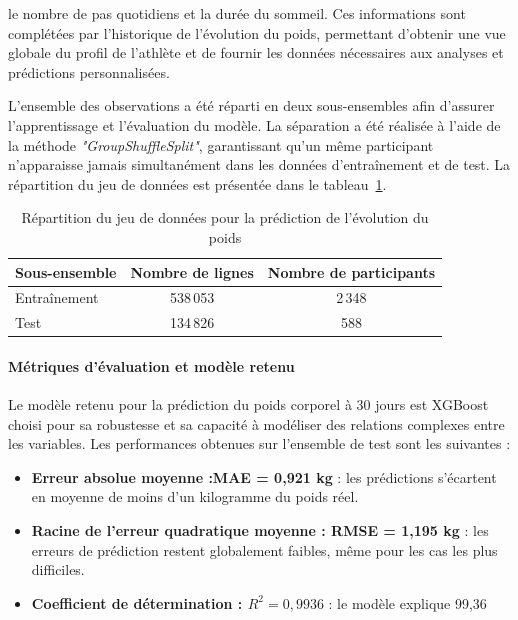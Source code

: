 \documentclass[a4paper,12pt]{report}
\begin{document}
 le nombre de pas quotidiens et la durée du sommeil. Ces informations sont complétées par l’historique de l’évolution du poids, 
 permettant d’obtenir une vue globale du profil de l’athlète et de fournir les données nécessaires aux analyses et prédictions personnalisées.


L'ensemble des observations a été réparti en deux sous-ensembles afin d'assurer
l'apprentissage et l'évaluation du modèle. La séparation a été réalisée à l'aide
de la méthode \textit{"GroupShuffleSplit"}, garantissant qu'un même participant
n'apparaisse jamais simultanément dans les données d'entraînement et de test.
La répartition du jeu de données est présentée dans le tableau~\ref{tab:split_weight}.
\begin{table}[H]
\centering
\caption{Répartition du jeu de données pour la prédiction de l'évolution du poids}
\label{tab:split_weight}
\begin{tabular}{|l|c|c|}
\hline
\textbf{Sous-ensemble} & \textbf{Nombre de lignes} & \textbf{Nombre de participants} \\ \hline
Entraînement & 538\,053 & 2\,348 \\ \hline
Test & 134\,826 & 588 \\ \hline
\end{tabular}
\end{table}
\paragraph{Métriques d’évaluation et modèle retenu}

Le modèle retenu pour la prédiction du poids corporel à 30 jours est XGBoost choisi pour sa robustesse et sa capacité à modéliser des relations complexes entre les variables. Les performances obtenues sur l’ensemble de test sont les suivantes :

\begin{itemize}
\item \textbf{ Erreur absolue moyenne :MAE = 0,921 kg} : les prédictions s’écartent en moyenne de moins d’un kilogramme du poids réel.
\item \textbf{ Racine de l'erreur quadratique moyenne : RMSE = 1,195 kg} : les erreurs de prédiction restent globalement faibles, même pour les cas les plus difficiles.
\item \textbf{ Coefficient de détermination : $R^2 = 0,9936$} : le modèle explique 99,36 %
\end{itemize}
\end{document}
